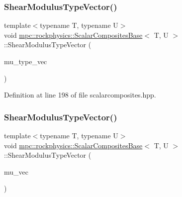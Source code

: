 \subsubsection{\texorpdfstring{Shear\+Modulus\+Type\+Vector()}{ShearModulusTypeVector()}\hspace{0.1cm}{\footnotesize\ttfamily [2/3]}}
{\footnotesize\ttfamily template$<$typename T, typename U$>$ \\
void \mbox{\hyperlink{classmpc_1_1rockphysics_1_1_scalar_composites_base}{mpc\+::rockphysics\+::\+Scalar\+Composites\+Base}}$<$ T, U $>$\+::Shear\+Modulus\+Type\+Vector (\begin{DoxyParamCaption}\item[{std\+::vector$<$ \mbox{\hyperlink{structmpc_1_1rockphysics_1_1_shear_modulus_type}{mpc\+::rockphysics\+::\+Shear\+Modulus\+Type}}$<$ T $>$ $>$}]{mu\+\_\+type\+\_\+vec }\end{DoxyParamCaption})\hspace{0.3cm}{\ttfamily [inline]}}



Definition at line 198 of file scalarcomposites.\+hpp.

\mbox{\label{classmpc_1_1rockphysics_1_1_scalar_composites_base_ab2bb8171013549edf67c6e8d98a23fb6}} 
\subsubsection{\texorpdfstring{Shear\+Modulus\+Type\+Vector()}{ShearModulusTypeVector()}\hspace{0.1cm}{\footnotesize\ttfamily [3/3]}}
{\footnotesize\ttfamily template$<$typename T, typename U$>$ \\
void \mbox{\hyperlink{classmpc_1_1rockphysics_1_1_scalar_composites_base}{mpc\+::rockphysics\+::\+Scalar\+Composites\+Base}}$<$ T, U $>$\+::Shear\+Modulus\+Type\+Vector (\begin{DoxyParamCaption}\item[{std\+::vector$<$ T $>$ \&}]{mu\+\_\+vec }\end{DoxyParamCaption})\hspace{0.3cm}{\ttfamily [inline]}}



